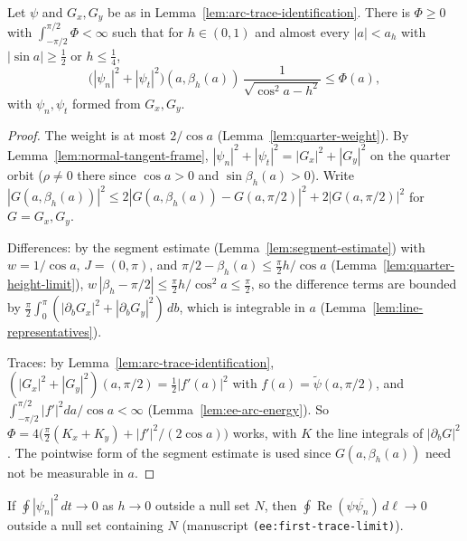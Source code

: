 \begin{lemma}
\label{lem:ee-quarter-bound}
\leanok
Let $\psi$ and $G_x,G_y$ be as in Lemma~\ref{lem:arc-trace-identification}. There is $\Phi\ge0$ with
$\int_{-\pi/2}^{\pi/2}\Phi<\infty$ such that for $h\in(0,1)$ and almost every $|a|<a_h$ with
$|\sin a|\ge\frac12$ or $h\le\frac14$,
\[
  \bigl(|\psi_n|^2+|\psi_t|^2\bigr)(a,\beta_h(a))\,\frac1{\sqrt{\cos^2a-h^2}}\le\Phi(a),
\]
with $\psi_n,\psi_t$ formed from $G_x,G_y$.
\end{lemma}

\begin{proof}
\leanok
The weight is at most $2/\cos a$ (Lemma~\ref{lem:quarter-weight}). By
Lemma~\ref{lem:normal-tangent-frame}, $|\psi_n|^2+|\psi_t|^2=|G_x|^2+|G_y|^2$ on the quarter orbit
($\rho\ne0$ there since $\cos a>0$ and $\sin\beta_h(a)>0$). Write
$|G(a,\beta_h(a))|^2\le2|G(a,\beta_h(a))-G(a,\pi/2)|^2+2|G(a,\pi/2)|^2$ for $G=G_x,G_y$.

Differences: by the segment estimate (Lemma~\ref{lem:segment-estimate}) with $w=1/\cos a$,
$J=(0,\pi)$, and $\pi/2-\beta_h(a)\le\frac\pi2h/\cos a$ (Lemma~\ref{lem:quarter-height-limit}),
$w\,|\beta_h-\pi/2|\le\frac\pi2h/\cos^2a\le\frac\pi2$, so the difference terms are bounded by
$\frac\pi2\int_0^\pi(|\partial_bG_x|^2+|\partial_bG_y|^2)\,db$, which is integrable in $a$
(Lemma~\ref{lem:line-representatives}).

Traces: by Lemma~\ref{lem:arc-trace-identification},
$(|G_x|^2+|G_y|^2)(a,\pi/2)=\frac12|f'(a)|^2$ with $f(a)=\tilde\psi(a,\pi/2)$, and
$\int_{-\pi/2}^{\pi/2}|f'|^2da/\cos a<\infty$ (Lemma~\ref{lem:ee-arc-energy}). So
$\Phi=4\bigl(\frac\pi2(K_x+K_y)+|f'|^2/(2\cos a)\bigr)$ works, with $K$ the line integrals of
$|\partial_bG|^2$. The pointwise form of the segment estimate is used since $G(a,\beta_h(a))$ need
not be measurable in $a$.
\end{proof}

\begin{lemma}
\label{lem:ee-first-trace-limit}
\leanok
If $\oint|\psi_n|^2\,dt\to0$ as $h\to0$ outside a null set $N$, then
$\oint\operatorname{Re}(\psi\overline{\psi_n})\,d\ell\to0$ outside a null set containing $N$
(manuscript \texttt{(ee:first-trace-limit)}).
\end{lemma}

